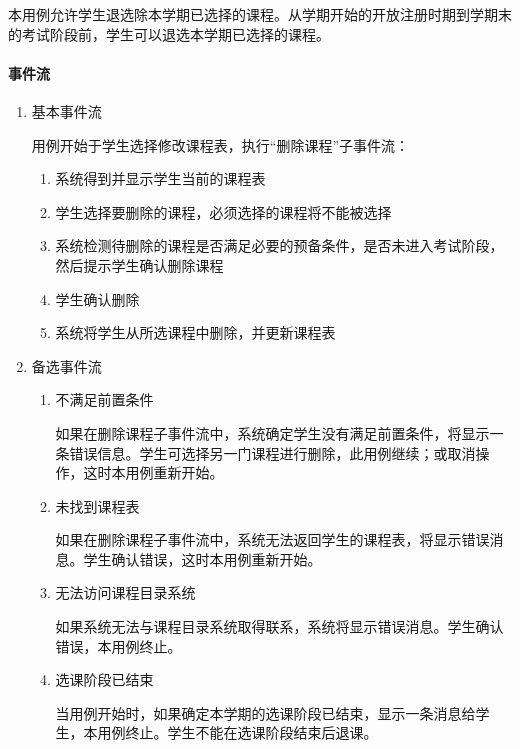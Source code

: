 本用例允许学生退选除本学期已选择的课程。从学期开始的开放注册时期到学期末的考试阶段前，学生可以退选本学期已选择的课程。
  
\paragraph{事件流}
  \begin{enumerate}
    \item 基本事件流
    
    用例开始于学生选择修改课程表，执行“删除课程”子事件流：
    \begin{enumerate}[(1)]
      \item 系统得到并显示学生当前的课程表
      \item 学生选择要删除的课程，必须选择的课程将不能被选择
      \item 系统检测待删除的课程是否满足必要的预备条件，是否未进入考试阶段，然后提示学生确认删除课程
      \item 学生确认删除
      \item 系统将学生从所选课程中删除，并更新课程表
    \end{enumerate}
    
    \item 备选事件流
    
    \begin{enumerate}[(1)]
      \item 不满足前置条件
      
      \CJKindent 如果在删除课程子事件流中，系统确定学生没有满足前置条件，将显示一条错误信息。学生可选择另一门课程进行删除，此用例继续；或取消操作，这时本用例重新开始。
      
      \item 未找到课程表
      
      \CJKindent 如果在删除课程子事件流中，系统无法返回学生的课程表，将显示错误消息。学生确认错误，这时本用例重新开始。

      \item 无法访问课程目录系统
      
      \CJKindent 如果系统无法与课程目录系统取得联系，系统将显示错误消息。学生确认错误，本用例终止。
      
      \item 选课阶段已结束
      
      \CJKindent 当用例开始时，如果确定本学期的选课阶段已结束，显示一条消息给学生，本用例终止。学生不能在选课阶段结束后退课。
    \end{enumerate}
  \end{enumerate}
  
